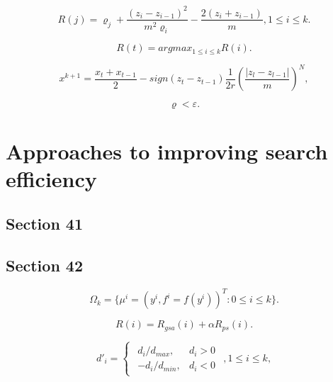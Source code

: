 \documentclass[runningheads]{llncs}
\begin{document}
\begin{equation}
    \label{eq:11}
    R(j) = \varrho_j + \frac{(z_i-z_{i-1})^2}{m^2 \varrho_i} - \frac{2 (z_i+z_{i-1})}{m}, 1 \leq i \leq k.
\end{equation}


\begin{equation}
    \label{eq:12}
    R(t) = argmax_{1 \leq i \leq k} {R(i)}.
\end{equation}


\begin{equation}
    \label{eq:13}
    x^{k+1} = \frac{x_t + x_{t-1}}{2} - sign(z_t - z_{t-1}) \frac{1}{2r} \left(\frac{|z_l - z_{l-1}|}{m} \right)^N,
\end{equation}


\begin{equation}
    \label{eq:14}
    \varrho < \varepsilon.
\end{equation}



\section{Approaches to improving search efficiency}
\label{sec:4}

\subsection{Section 41}
\label{ssec:41}

\subsection{Section 42}
\label{ssec:42}

\begin{equation}
    \label{eq:15}
    \Omega_k=\{\mu^i = (y^i,f^i=f(y^i))^T: 0 \leq i \leq k\}.
\end{equation}


\begin{equation}
    \label{eq:16}
    R(i) = R_{gsa} (i) +  \alpha R_{ps} (i).
\end{equation}


\begin{equation}
    \label{eq:17}
d'_i=
\begin{cases}
  \begin{matrix}
     d_i / d_{max}, & d_i > 0 \\
     -d_i / d_{min}, & d_i < 0 
  \end{matrix}
\end{cases}, 
1 \leq i \leq k,
\end{equation}
\end{document}
